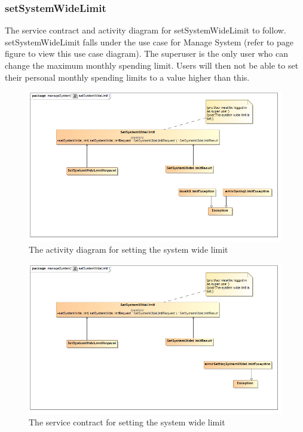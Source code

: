 \documentclass[a4paper,12pt]{article}
\begin{document}
\subsubsection{setSystemWideLimit}
The service contract and activity diagram for setSystemWideLimit to follow. setSystemWideLimit falls under the use case for Manage System (refer to page   figure   to view this use case diagram). The superuser is the only user who can change the maximum monthly spending limit. Users will then not be able to set their personal monthly spending limits to a value higher than this.
\begin{figure}[H]
  \centering
    \includegraphics[width=1.0\textwidth]{../images/setSystemWideLimit.png}
    \caption{The activity diagram for setting the system wide limit} 
\end{figure}

\begin{figure}[H]
	\centering
	\includegraphics[width=1.0\textwidth]{../images/setSystemWideLimitServiceContract.png}
	\caption{The service contract for setting the system wide limit}
\end{figure}
\end{document}
